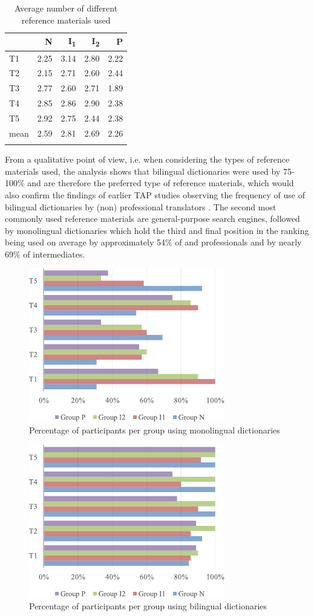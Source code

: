 \documentclass[output=paper]{LSP/langsci}
\begin{document}
\begin{table}
\caption{Average number of different reference materials used}
\label{quinci:tab:5}
\begin{tabular}{lrrrr}
\lsptoprule
& N & I\textsubscript{1} & I\textsubscript{2} & P \\
\midrule
T1 & 2.25 & 3.14 & 2.80 & 2.22\\
T2 & 2.15 & 2.71 & 2.60 & 2.44\\
T3 & 2.77 & 2.60 & 2.71 & 1.89\\
T4 & 2.85 & 2.86 & 2.90 & 2.38\\
T5 & 2.92 & 2.75 & 2.44 & 2.38\\
\midrule
mean & 2.59 & 2.81 & 2.69 & 2.26\\
\lspbottomrule
\end{tabular}
\end{table}

From a qualitative point of view, i.e. when considering the types of reference materials used, the analysis shows that bilingual dictionaries were used by 75-100\% and are therefore the preferred type of reference materials, which would also confirm the findings of earlier TAP studies observing the frequency of use of bilingual dictionaries by (non) professional translators \citep{Jensen1999, Krings1986Was, Kunzli2001}. The second most commonly used reference materials are general-purpose search engines, followed by monolingual dictionaries which hold the third and final position in the ranking being used on average by approximately 54\% of  and professionals and by nearly 69\% of intermediates.

\begin{figure}
 \includegraphics[width=.4\textwidth]{figures/quinci/figure2.pdf}
 \caption{Percentage of participants per group using monolingual dictionaries}
 \label{quinci:fig:2}
\end{figure}

\begin{figure}
 \includegraphics[width=.4\textwidth]{figures/quinci/figure3.pdf}
 \caption{Percentage of participants per group using bilingual dictionaries}
 \label{quinci:fig:3}
\end{figure}
\end{document}
